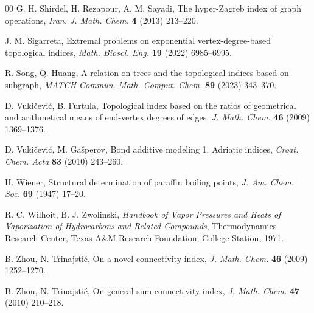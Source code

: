 \documentclass[a5paper, 10pt]{article}
\theoremstyle{plain}
\theoremstyle{remark}
\theoremstyle{definition}
\begin{document}
\begin{thebibliography}{00}
   G. H. Shirdel, H. Rezapour,
  A. M. Sayadi, The hyper-Zagreb index of graph operations,
  \textit{Iran. J. Math. Chem.\/} \textbf{4} (2013) 213--220.

 J. M. Sigarreta, Extremal problems on
  exponential vertex-degree-based topological indices, \textit{Math.
  Biosci. Eng.\/} \textbf{19} (2022) 6985--6995.

   R. Song, Q. Huang, A relation on trees and the
  topological indices based on subgraph, \textit{MATCH Commun. Math.
  Comput. Chem.\/} \textbf{89} (2023) 343--370.

   D. Vuki\v{c}evi\'c, B. Furtula, Topological
  index based on the ratios of geometrical and arithmetical means of
  end-vertex degrees of edges, \textit{J. Math. Chem.\/} \textbf{46} (2009)
  1369--1376.

   D. Vuki\v{c}evi\'c, M. Ga\v{s}perov, Bond additive
  modeling 1. Adriatic indices, \textit{Croat. Chem. Acta\/} \textbf{83} (2010)
  243--260.

   H. Wiener, Structural determination of paraffin boiling
  points, \textit{J. Am. Chem. Soc.\/} \textbf{69} (1947) 17--20.

   R. C. Wilhoit, B. J. Zwolinski,
  \textit{Handbook of Vapor Pressures and Heats of Vaporization of
  Hydrocarbons and Related Compounds\/}, Thermodynamics Research Center, Texas A\&M Research Foundation, College Station, 1971.

  B. Zhou, N. Trinajsti\'c, On a novel connectivity index, \textit{J. Math.
  Chem.\/} \textbf{46} (2009) 1252--1270.

   B. Zhou, N. Trinajsti\'c, On general
  sum-connectivity index, \textit{J. Math. Chem.\/} \textbf{47} (2010)
  210--218.

\end{thebibliography}
\end{document}

